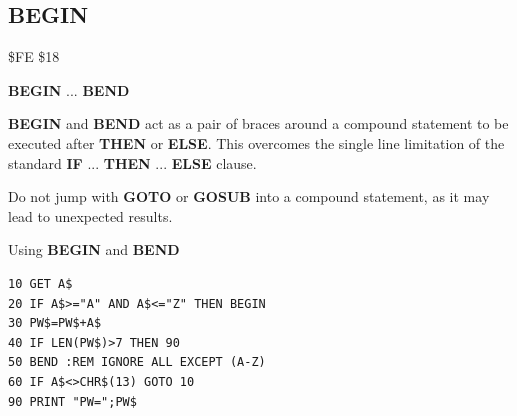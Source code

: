 \subsection{BEGIN}
\begin{description}[leftmargin=2cm,style=nextline]
\item [Token:] \$FE \$18
\item [Format:] {\bf BEGIN} ... {\bf BEND}
\item [Usage:] {\bf BEGIN} and {\bf BEND} act as
               a pair of braces around a compound statement
               to be executed after {\bf THEN} or {\bf ELSE}.
               This overcomes the single line limitation of the
               standard {\bf IF} ... {\bf THEN} ... {\bf ELSE} clause.
\item [Remarks:] Do not jump with {\bf GOTO} or {\bf GOSUB} into a
                 compound statement, as it may lead to unexpected
                 results.
\item [Example:] Using {\bf BEGIN} and {\bf BEND}
\begin{tcolorbox}[colback=black,coltext=white]
\verbatimfont{\codefont}
\begin{verbatim}
10 GET A$
20 IF A$>="A" AND A$<="Z" THEN BEGIN
30 PW$=PW$+A$
40 IF LEN(PW$)>7 THEN 90
50 BEND :REM IGNORE ALL EXCEPT (A-Z)
60 IF A$<>CHR$(13) GOTO 10
90 PRINT "PW=";PW$
\end{verbatim}
\end{tcolorbox}
\end{description}


\newpage
